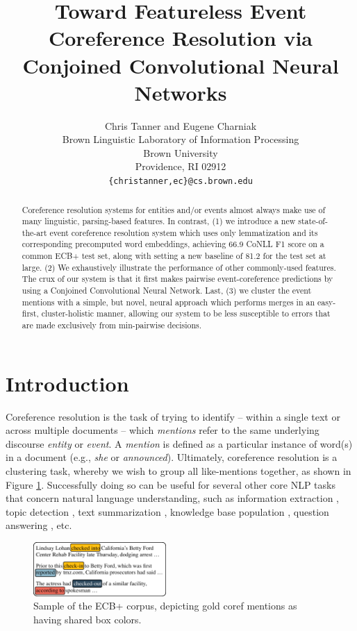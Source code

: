 \documentclass[11pt,a4paper]{article}
\title{Toward Featureless Event Coreference Resolution via Conjoined Convolutional Neural Networks}
\author{Chris Tanner \textnormal{and} Eugene Charniak\\
Brown Linguistic Laboratory of Information Processing \\
  Brown University \\
  Providence, RI  02912 \\
  {\tt \{christanner,ec\}@cs.brown.edu} \\}
\date{}
\begin{document}
\maketitle
\begin{abstract}
Coreference resolution systems for entities and/or events almost always make use of many linguistic, parsing-based features.  In contrast, (1) we introduce a new state-of-the-art event coreference resolution system which uses only lemmatization and its corresponding precomputed word embeddings, achieving 66.9 CoNLL F1 score on a common ECB+ test set, along with setting a new baseline of 81.2 for the test set at large. (2) We exhaustively illustrate the performance of other commonly-used features.  The crux of our system is that it first makes pairwise event-coreference predictions by using a Conjoined Convolutional Neural Network.  Last, (3) we cluster the event mentions with a simple, but novel, neural approach which performs merges in an easy-first, cluster-holistic manner, allowing our system to be less susceptible to errors that are made exclusively from min-pairwise decisions.
\end{abstract}

\section{Introduction}
Coreference resolution is the task of trying to identify -- within a single text or across multiple documents -- which \textit{mentions} refer to the same underlying discourse \textit{entity} or \textit{event}.  A \textit{mention} is defined as a particular instance of word(s) in a document (e.g., \textit{she} or \textit{announced}).  Ultimately, coreference resolution is a clustering task, whereby we wish to group all like-mentions together, as shown in Figure \ref{fig:corpus}.  Successfully doing so can be useful for several other core NLP tasks that concern natural language understanding, such as information extraction \cite{Humphreys:1997}, topic detection \cite{Allan:1998}, text summarization \cite{Daniel:2003}, knowledge base population \cite{Cross_Document_Coreference_Resolution_A_Key_Technology_for_Learning_by_Reading}, question answering \cite{Narayanan:2004:QAB:1220355.1220455}, etc.

\begin{figure}[ht]
\centering
	\includegraphics[width=0.45\textwidth]{corpus}
	\caption{Sample of the ECB+ corpus, depicting gold coref mentions as having shared box colors.}
	\label{fig:corpus}
\end{figure}
\end{document}
